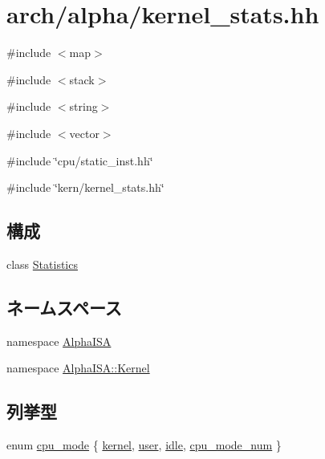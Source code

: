 \hypertarget{arch_2alpha_2kernel__stats_8hh}{
\section{arch/alpha/kernel\_\-stats.hh}
\label{arch_2alpha_2kernel__stats_8hh}
}
{\ttfamily \#include $<$map$>$}\par
{\ttfamily \#include $<$stack$>$}\par
{\ttfamily \#include $<$string$>$}\par
{\ttfamily \#include $<$vector$>$}\par
{\ttfamily \#include \char`\"{}cpu/static\_\-inst.hh\char`\"{}}\par
{\ttfamily \#include \char`\"{}kern/kernel\_\-stats.hh\char`\"{}}\par
\subsection*{構成}
\begin{DoxyCompactItemize}
\item 
class \hyperlink{classAlphaISA_1_1Kernel_1_1Statistics}{Statistics}
\end{DoxyCompactItemize}
\subsection*{ネームスペース}
\begin{DoxyCompactItemize}
\item 
namespace \hyperlink{namespaceAlphaISA}{AlphaISA}
\item 
namespace \hyperlink{namespaceAlphaISA_1_1Kernel}{AlphaISA::Kernel}
\end{DoxyCompactItemize}
\subsection*{列挙型}
\begin{DoxyCompactItemize}
\item 
enum \hyperlink{namespaceAlphaISA_1_1Kernel_aa1fc3805dac6f71f457fbbc263105bf6}{cpu\_\-mode} \{ \hyperlink{namespaceAlphaISA_1_1Kernel_aa1fc3805dac6f71f457fbbc263105bf6adb0339d028e596254368234e5ab09f9d}{kernel}, 
\hyperlink{namespaceAlphaISA_1_1Kernel_aa1fc3805dac6f71f457fbbc263105bf6a04981b8c09a50ccfb1d92fc11b81c36a}{user}, 
\hyperlink{namespaceAlphaISA_1_1Kernel_aa1fc3805dac6f71f457fbbc263105bf6a0e9a37114c0e458d28d52f06ec0f2242}{idle}, 
\hyperlink{namespaceAlphaISA_1_1Kernel_aa1fc3805dac6f71f457fbbc263105bf6a4572f7cf10830e04921c8896f22102ba}{cpu\_\-mode\_\-num}
 \}
\end{DoxyCompactItemize}
